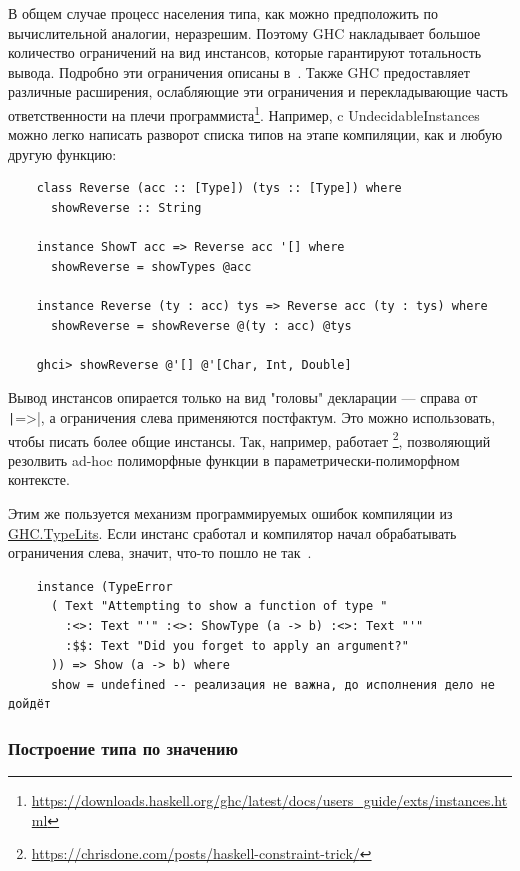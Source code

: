 В общем случае процесс населения типа, как можно предположить по вычислительной аналогии, неразрешим.
Поэтому GHC накладывает большое количество ограничений на вид инстансов, которые гарантируют тотальность вывода.
Подробно эти ограничения описаны в~\cite{sulzmann2007understanding}.
Также GHC предоставляет различные расширения, ослабляющие эти ограничения и перекладывающие часть ответственности на плечи программиста\footnote{\url{https://downloads.haskell.org/ghc/latest/docs/users_guide/exts/instances.html}}.
Например, c UndecidableInstances можно легко написать разворот списка типов на этапе компиляции, как и любую другую функцию:
\begin{verbatim}
    class Reverse (acc :: [Type]) (tys :: [Type]) where
      showReverse :: String

    instance ShowT acc => Reverse acc '[] where
      showReverse = showTypes @acc

    instance Reverse (ty : acc) tys => Reverse acc (ty : tys) where
      showReverse = showReverse @(ty : acc) @tys

    ghci> showReverse @'[] @'[Char, Int, Double]
\end{verbatim}

Вывод инстансов опирается только на вид "головы" декларации --- справа от \texttt|=>|, а ограничения слева применяются постфактум.
Это можно использовать, чтобы писать более общие инстансы.
Так, например, работает \footnote{\url{https://chrisdone.com/posts/haskell-constraint-trick/}}, позволяющий резолвить ad-hoc полиморфные функции в параметрически-полиморфном контексте.

Этим же пользуется механизм программируемых ошибок компиляции из \href{https://hackage.haskell.org/package/base-4.20.0.1/docs/GHC-TypeLits.html}{GHC.TypeLits}.
Если инстанс сработал и компилятор начал обрабатывать ограничения слева, значит, что-то пошло не так~\cite[глава 12]{maguire-types}.

\begin{verbatim}
    instance (TypeError
      ( Text "Attempting to show a function of type "
        :<>: Text "'" :<>: ShowType (a -> b) :<>: Text "'"
        :$$: Text "Did you forget to apply an argument?"
      )) => Show (a -> b) where
      show = undefined -- реализация не важна, до исполнения дело не дойдёт
\end{verbatim}

\subsubsection{Построение типа по значению}

